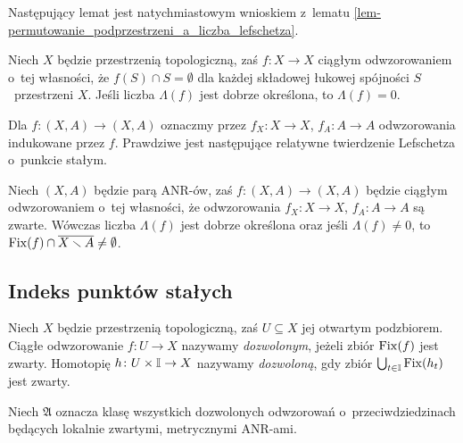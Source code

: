 Następujący lemat jest natychmiastowym wnioskiem z~lematu \ref{lem-permutowanie_podprzestrzeni_a_liczba_lefschetza}.

\begin{lem}\label{lem-permutowanie-skladowych-a-liczba-lefschetza}
Niech $X$ będzie przestrzenią topologiczną, zaś $f\colon X\to X$ ciągłym odwzorowaniem o~tej własności, że $f(S)\cap S=\emptyset$ dla każdej składowej łukowej spójności $S$~przestrzeni $X$. Jeśli liczba $\Lambda(f)$ jest dobrze określona, to $\Lambda(f)=0$.
\end{lem}

Dla $f\colon (X,A)\to (X,A)$ oznaczmy przez $f_X\colon X\to X$, $f_A\colon A\to A$ odwzorowania indukowane przez $f$. Prawdziwe jest następujące relatywne twierdzenie Lefschetza o~punkcie stałym.
\begin{tw}\label{tw-lefschetza_o_punkcie_stalym}
Niech $(X,A)$ będzie parą \mbox{ANR}-ów, zaś $f\colon (X,A)\to (X,A)$ będzie ciągłym odwzorowaniem o~tej własności, że odwzorowania $f_X\colon X\to X$, $f_A\colon A\to A$ są zwarte. Wówczas liczba $\Lambda(f)$ jest dobrze określona oraz jeśli $\Lambda(f)\not=0$, to $\operatorname{Fix}(f)\cap \overline{X\smallsetminus A}\not=\emptyset$.
\end{tw}








\subsection{Indeks punktów stałych}
Niech $X$ będzie przestrzenią topologiczną, zaś $U\subseteq X$ jej  otwartym podzbiorem. Ciągłe odwzorowanie $f\colon U\to X$ nazywamy \textit{dozwolonym}, jeżeli zbiór $\operatorname{Fix}(f)$ jest zwarty. Homotopię $h\colon U\times \mathbb{I}\to X$ nazywamy \textit{dozwoloną}, gdy zbiór $\bigcup_{t\in \mathbb{I}}\operatorname{Fix}(h_t)$ jest zwarty.

Niech $\mathfrak{A}$ oznacza klasę wszystkich dozwolonych odwzorowań o~przeciwdziedzinach będących lokalnie zwartymi, metrycznymi ANR-ami.

